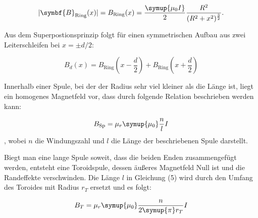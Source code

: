 \begin{equation}
    \lvert\symbf{B}_\text{Ring}(x)\rvert = B_\text{Ring}(x) = \frac{\symup{\mu_0 I}}{2} \frac{R^2}{(R^2 + x^2)^{\frac{3}{2}}}.
    \label{eqn:ring}
\end{equation}


Aus dem Superpostionsprinzip folgt für einen symmetrischen Aufbau aus zwei Leiterschleifen bei $x=\pm d / 2 $:

\begin{equation}
    B_d(x)=B_\text{Ring}(x-\frac{d}{2}) + B_\text{Ring}(x+\frac{d}{2})
    \label{eqn:2ringe}
\end{equation}

Innerhalb einer Spule, bei der der Radius sehr viel kleiner als die Länge ist, liegt ein homogenes Magnetfeld vor, dass durch folgende
Relation beschrieben werden kann:

\begin{equation}
    B_\text{Sp} = \mu_r \symup{\mu_0} \frac{n}{l} I
    \label{eqn:langespule}
\end{equation}
, wobei $n$ die Windungszahl und $l$ die Länge der beschriebenen Spule darstellt.


Biegt man eine lange Spule soweit, dass die beiden Enden zusammengefügt werden, entsteht eine Toroidspule, dessen äußeres Magnetfeld Null ist und die
Randeffekte verschwinden. Die Länge $l$ in Gleichung (5) wird durch den Umfang des Toroides mit Radius
$r_T$ ersetzt und es folgt:

\begin{equation}
    B_T=\mu_r \symup{\mu_0} \frac{n}{2 \symup{\pi} r_T} I
    \label{eqn:toroid}
\end{equation}
